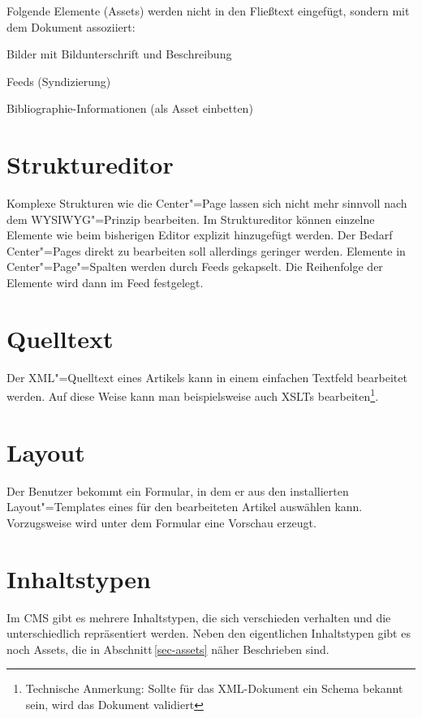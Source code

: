 Folgende Elemente (Assets) werden nicht in den Fließtext eingefügt, sondern
mit dem Dokument assoziiert:

\begin{compactitem}
  \item Bilder mit Bildunterschrift und Beschreibung 
  \item Feeds (Syndizierung)
  \item Bibliographie-Informationen (als Asset einbetten)
\end{compactitem}

\section{Struktureditor} \label{sec-forms}

Komplexe Strukturen wie die Center"=Page lassen sich nicht mehr sinnvoll nach
dem WYSIWYG"=Prinzip bearbeiten. Im Struktureditor können einzelne Elemente
wie beim bisherigen Editor explizit hinzugefügt werden. Der Bedarf
Center"=Pages direkt zu bearbeiten soll allerdings geringer werden. Elemente in
Center"=Page"=Spalten werden durch Feeds gekapselt. Die Reihenfolge der
Elemente wird dann im Feed festgelegt.


\section{Quelltext} \label{sec-source}

Der XML"=Quelltext eines Artikels kann in einem einfachen Textfeld bearbeitet
werden. Auf diese Weise kann man beispielsweise auch XSLTs
bearbeiten\footnote{Technische Anmerkung: Sollte für das XML-Dokument ein
Schema bekannt sein, wird das Dokument validiert}.




\section{Layout}

Der Benutzer bekommt ein Formular, in dem er aus den installierten
Layout"=Templates eines für den bearbeiteten Artikel auswählen kann.
Vorzugsweise wird unter dem Formular eine Vorschau erzeugt.


\section{Inhaltstypen}

Im CMS gibt es mehrere Inhaltstypen, die sich verschieden verhalten und die
unterschiedlich repräsentiert werden. Neben den eigentlichen Inhaltstypen
gibt es noch Assets, die in Abschnitt\,\vref{sec-assets} näher Beschrieben
sind. 

